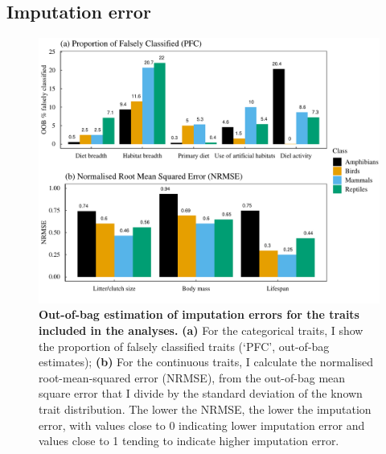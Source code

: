 

\subsection{Imputation error}

\begin{figure}[h!]
\centering
\includegraphics[scale=0.7]{Supporting/Chapter4/Figures/Imputation_errors}
\caption[Out-of-bag estimation of imputation errors for the traits included in the analyses]{\textbf{Out-of-bag estimation of imputation errors for the traits included in the analyses.} \textbf{(a)} For the categorical traits, I show the proportion of falsely classified traits (`PFC', out-of-bag estimates); \textbf{(b)} For the continuous traits, I calculate the normalised root-mean-squared error (NRMSE), from the out-of-bag mean square error that I divide by the standard deviation of the known trait distribution. The lower the NRMSE, the lower the imputation error, with values close to 0 indicating lower imputation error and values close to 1 tending to indicate higher imputation error.} 
\label{SI_4_Figure2}
\end{figure}



